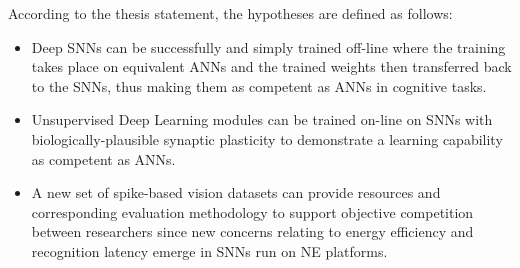 According to the thesis statement, the hypotheses are defined as follows: 
\begin{itemize}
%

	\item 
	Deep SNNs can be successfully and simply trained off-line where the training takes place on equivalent ANNs and the trained weights then transferred back to the SNNs, thus making them as competent as ANNs in cognitive tasks. 
	

	\item 
	Unsupervised Deep Learning modules can be trained on-line on SNNs with biologically-plausible synaptic plasticity to demonstrate a learning capability as competent as ANNs.


	\item 
	A new set of spike-based vision datasets can provide resources and corresponding evaluation methodology to support objective competition between researchers since new concerns relating to energy efficiency and recognition latency emerge in SNNs run on NE platforms.

\end{itemize}


